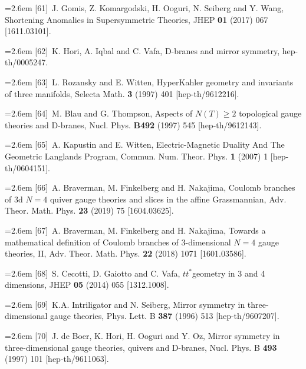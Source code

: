 \par\noindent\hangindent=2.6em [61]~J. Gomis, Z. Komargodski, H. Ooguri, N. Seiberg and Y. Wang, Shortening Anomalies in Supersymmetric Theories, JHEP \textbf{01} (2017) 067 [1611.03101].

\par\noindent\hangindent=2.6em [62]~K. Hori, A. Iqbal and C. Vafa, D-branes and mirror symmetry, hep-th/0005247.

\par\noindent\hangindent=2.6em [63]~L. Rozansky and E. Witten, HyperKahler geometry and invariants of three manifolds, Selecta Math. \textbf{3} (1997) 401 [hep-th/9612216].

\par\noindent\hangindent=2.6em [64]~M. Blau and G. Thompson, Aspects of $N(T)\geq 2$ topological gauge theories and D-branes, Nucl. Phys. \textbf{B492} (1997) 545 [hep-th/9612143].

\par\noindent\hangindent=2.6em [65]~A. Kapustin and E. Witten, Electric-Magnetic Duality And The Geometric Langlands Program, Commun. Num. Theor. Phys. \textbf{1} (2007) 1 [hep-th/0604151].

\par\noindent\hangindent=2.6em [66]~A. Braverman, M. Finkelberg and H. Nakajima, Coulomb branches of 3d $N=4$ quiver gauge theories and slices in the affine Grassmannian, Adv. Theor. Math. Phys. \textbf{23} (2019) 75 [1604.03625].

\par\noindent\hangindent=2.6em [67]~A. Braverman, M. Finkelberg and H. Nakajima, Towards a mathematical definition of Coulomb branches of 3-dimensional $N=4$ gauge theories, II, Adv. Theor. Math. Phys. \textbf{22} (2018) 1071 [1601.03586].

\par\noindent\hangindent=2.6em [68]~S. Cecotti, D. Gaiotto and C. Vafa, $tt^*$geometry in 3 and 4 dimensions, JHEP \textbf{05} (2014) 055 [1312.1008].

\par\noindent\hangindent=2.6em [69]~K.A. Intriligator and N. Seiberg, Mirror symmetry in three-dimensional gauge theories, Phys. Lett. B \textbf{387} (1996) 513 [hep-th/9607207].


\par\noindent\hangindent=2.6em [70]~J. de Boer, K. Hori, H. Ooguri and Y. Oz, Mirror symmetry in three-dimensional gauge theories, quivers and D-branes, Nucl. Phys. B \textbf{493} (1997) 101 [hep-th/9611063].

